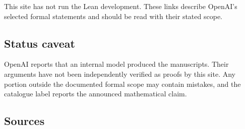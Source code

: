 \documentclass[11pt]{article}
\begin{document}
This site has not run the Lean development. These links describe OpenAI’s selected formal statements and should be read with their stated scope.

\subsection{Status caveat}
OpenAI reports that an internal model produced the manuscripts. Their arguments have not been independently verified as proofs by this site. Any portion outside the documented formal scope may contain mistakes, and the catalogue label reports the announced mathematical claim.

\subsection{Sources}
\end{document}
